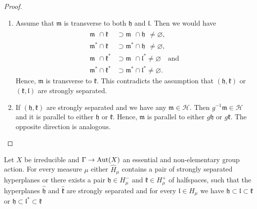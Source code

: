\begin{proof}~\vspace{-6pt}
  \begin{enumerate}
  \item Assume that \(\mathfrak{m}\) is transverse to both \(\mathfrak{h}\) and \(\mathfrak{l}\). Then we would have
    \begin{align*}
      \mathfrak{m}^{\phantom{\ast}} \cap \mathfrak{k}^{\phantom{\ast}} & \supset \mathfrak{m}^{\phantom{\ast}} \cap \mathfrak{h}^{\phantom{\ast}} \neq \varnothing,\\
      \mathfrak{m}^\ast \cap \mathfrak{k}^{\phantom{\ast}}  & \supset \mathfrak{m}^\ast \cap \mathfrak{h}^{\phantom{\ast}} \neq \varnothing,\\
      \mathfrak{m}^{\phantom{\ast}} \cap \mathfrak{k}^\ast & \supset \mathfrak{m}^{\phantom{\ast}} \cap \mathfrak{l}^\ast \neq \varnothing\quad \text{and}\\
      \mathfrak{m}^\ast \cap \mathfrak{k}^\ast & \supset \mathfrak{m}^\ast \cap \mathfrak{l}^\ast \neq \varnothing.
    \end{align*}
    Hence, \(\mathfrak{m}\) is transverse to \(\mathfrak{k}\). This contradicts the assumption that \((\mathfrak{h}, \mathfrak{k})\) or \((\mathfrak{k}, \mathfrak{l})\) are strongly separated.
  \item If \((\mathfrak{h}, \mathfrak{k})\) are strongly separated and we have any \(\mathfrak{m} \in \mathcal{H}\). Then \(g^{-1}\mathfrak{m} \in \mathcal{H}\) and it is parallel to either \(\mathfrak{h}\) or \(\mathfrak{k}\). Hence, \(\mathfrak{m}\) is parallel to either \(g\mathfrak{h}\) or \(g\mathfrak{k}\). The opposite direction is analogous.
  \end{enumerate}
\end{proof}

\begin{lemma}[{\cite[Lemma~4.19]{MR3509968}}]
  \label{lem:4.19}
  Let \(X\) be irreducible and \(\Gamma \to \operatorname{Aut}(X)\) an essential and non-elementary group action. For every measure \(\mu\) either \(\hat H_\mu\) contains a pair of strongly separated hyperplanes or there exists a pair \(\mathfrak{h} \in H_\mu^-\) and \(\mathfrak{k} \in H_\mu^+\) of halfspaces, such that the hyperplanes \(\mathfrak{\hat h}\) and \(\mathfrak{\hat k}\) are strongly separated and for every \(\mathfrak{l} \in H_\mu\) we have  \(\mathfrak{h} \subset \mathfrak{l} \subset  \mathfrak{k}\) or \(\mathfrak{h} \subset \mathfrak{l}^\ast \subset \mathfrak{k}\)
\end{lemma}

